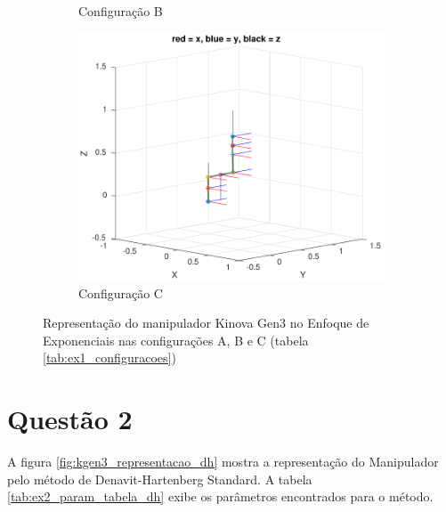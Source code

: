 \documentclass[a4paper,11pt]{article}
\theoremstyle{mytheor}
\begin{document}
\begin{figure}[!ht]
\begin{minipage}{\linewidth}
\begin{subfigure}[b]{0.45\textwidth}
    \caption{Configuração B}
    \end{subfigure}
  \end{minipage}
  \begin{minipage}{\linewidth}
  \centering
    \begin{subfigure}[b]{0.45\textwidth}
    \includegraphics[width=1\textwidth]{figs/ex1_c.pdf}
    \caption{Configuração C}
    \end{subfigure}
  \end{minipage}
\caption{Representação do manipulador Kinova Gen3 no Enfoque de Exponenciais nas configurações A, B e C (tabela \ref{tab:ex1_configuracoes})}
\label{fig:ex1_configuracoes}
\end{figure}



\section*{Questão 2}

A figura \ref{fig:kgen3_representacao_dh} mostra a representação do Manipulador pelo método de Denavit-Hartenberg Standard. A tabela \ref{tab:ex2_param_tabela_dh} exibe os parâmetros encontrados para o método.
\end{document}
